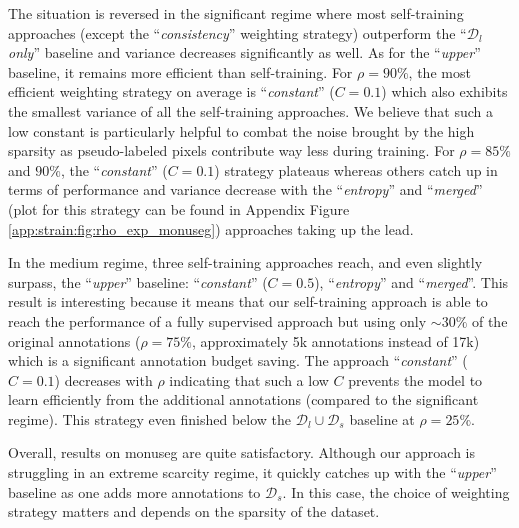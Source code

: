 The situation is reversed in the significant regime where most self-training approaches (except the ``\textit{consistency}'' weighting strategy) outperform the ``\textit{$\mathcal{D}_l$ only}'' baseline and variance decreases significantly as well. As for the ``\textit{upper}'' baseline, it remains more efficient than self-training. For $\rho = 90\%$, the most efficient weighting strategy on average is ``\textit{constant}'' ($C = 0.1$) which also exhibits the smallest variance of all the self-training approaches. We believe that such a low constant is particularly helpful to combat the noise brought by the high sparsity as pseudo-labeled pixels contribute way less during training. For $\rho = 85\%$ and $90\%$, the ``\textit{constant}'' ($C = 0.1$) strategy plateaus whereas others catch up in terms of performance and variance decrease with the ``\textit{entropy}'' and ``\textit{merged}'' (plot for this strategy can be found in Appendix Figure \ref{app:strain:fig:rho_exp_monuseg}) approaches taking up the lead.

In the medium regime, three self-training approaches reach, and even slightly surpass, the ``\textit{upper}'' baseline: ``\textit{constant}'' ($C = 0.5$), ``\textit{entropy}'' and ``\textit{merged}''. This result is interesting because it means that our self-training approach is able to reach the performance of a fully supervised approach but using only $\sim 30\%$ of the original annotations (\ie $\rho = 75\%$, approximately 5k annotations instead of 17k) which is a significant annotation budget saving. The approach ``\textit{constant}'' ($C=0.1$) decreases with $\rho$ indicating that such a low $C$ prevents the model to learn efficiently from the additional annotations (compared to the significant regime). This strategy even finished below the $\mathcal{D}_l \cup \mathcal{D}_s$ baseline at $\rho = 25\%$. 

Overall, results on \acrshort{monuseg}  are quite satisfactory. Although our approach is struggling in an extreme scarcity regime, it quickly catches up with the ``\textit{upper}'' baseline as one adds more annotations to $\mathcal{D}_s$. In this case, the choice of weighting strategy matters and depends on the sparsity of the dataset.

